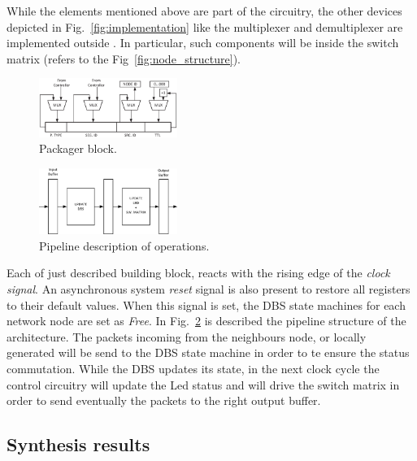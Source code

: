 While the elements mentioned above are part of the \disr{} circuitry,
the other devices depicted in Fig.~\ref{fig:implementation} like the
multiplexer and demultiplexer are implemented outside \disr{}. In
particular, such components will be inside the switch matrix  (refers
to the Fig~\ref{fig:node_structure}).

\begin{figure}
  \centering
  \includegraphics[width=0.40\textwidth]{pictures/packager.eps}
  \caption{Packager block.}
 \label{fig:packager}
\end{figure}

\begin{figure}
  \centering
  \includegraphics[width=0.40\textwidth]{pictures/pipeline.eps}
  \caption{Pipeline description of \disr{} operations.}
 \label{fig:pipeline}
\end{figure}

Each of just described building block, reacts with the rising edge  of
the \emph{clock signal}. An asynchronous system \emph{reset} signal is
also present to restore all registers to their default values. When
this signal is set, the DBS state machines for each network
node are set as \emph{Free}.  
In Fig.~\ref{fig:pipeline} is described the pipeline structure of the
\disr{} architecture. The packets incoming from the neighbours node, or
locally generated will be send to the DBS state machine in order to te
ensure the status commutation. While the DBS updates its state,  in the
next clock cycle the control circuitry will update the Led status and
will drive the switch matrix in order to send eventually the packets to
the  right output buffer.
\subsection{Synthesis results}

